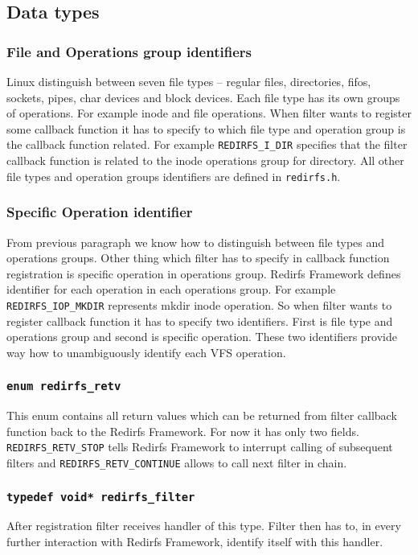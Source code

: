 \subsection{Data types}

\subsubsection{File and Operations group identifiers}
Linux distinguish between seven file types -- regular files, directories, fifos,
sockets, pipes, char devices and block devices. Each file type has its own groups of
operations. For example inode and file operations. When filter wants to register some 
callback function it has to specify to which file type and operation group is the
callback function related. For example \texttt{REDIRFS\_I\_DIR} specifies that the
filter callback function is related to the inode operations group for directory.
All other file types and operation groups identifiers are defined in
\texttt{redirfs.h}.

\subsubsection{Specific Operation identifier}
From previous paragraph we know how to distinguish between file types and operations
groups. Other thing which filter has to specify in callback function registration is
specific operation in operations group. Redirfs Framework defines identifier for each
operation in each operations group. For example \texttt{REDIRFS\_IOP\_MKDIR}
represents mkdir inode operation. So when filter wants to register callback function
it has to specify two identifiers. First is file type and operations group and second
is specific operation. These two identifiers provide way how to unambiguously
identify each VFS operation.

\subsubsection{\texttt{enum redirfs\_retv}}
This enum contains all return values which can be returned from filter callback
function back to the Redirfs Framework. For now it has only two fields.
\texttt{REDIRFS\_RETV\_STOP} tells Redirfs Framework to interrupt calling of subsequent
filters and \texttt{REDIRFS\_RETV\_CONTINUE} allows to call next filter in chain.

\subsubsection{\texttt{typedef void* redirfs\_filter}}
After registration filter receives handler of this type. Filter then has to, in every
further interaction with Redirfs Framework, identify itself with this handler.

